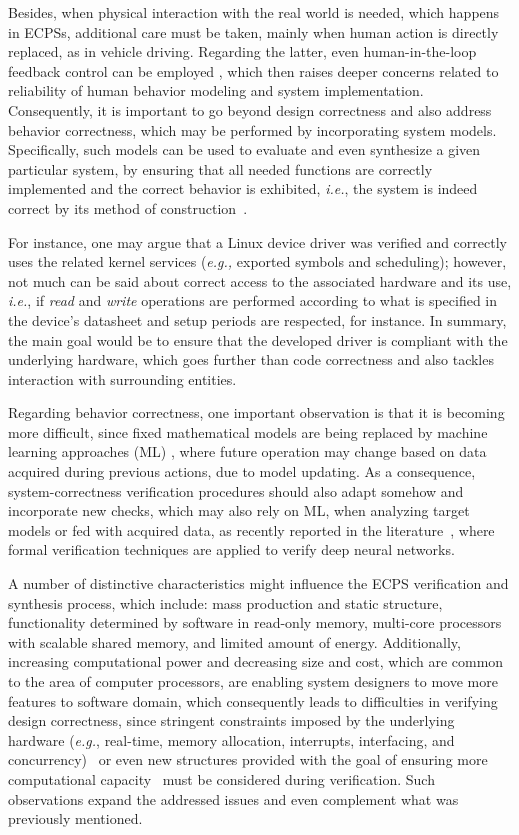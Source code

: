 \documentclass[format=acmsmall, review=false, screen=true]{acmart}
\begin{document}
Besides, when physical interaction with the real world is needed, which happens in ECPSs, additional care must be taken, mainly when human action is directly replaced, as in vehicle driving. Regarding the latter, even human-in-the-loop feedback control can be employed \cite{munir}, which then raises deeper concerns related to reliability of human behavior modeling and system implementation. Consequently, it is important to go beyond design correctness and also address behavior correctness, which may be performed by incorporating system models. Specifically, such models can be used to evaluate and even synthesize a given particular system, by ensuring that all needed functions are correctly implemented and the correct behavior is exhibited, {\it i.e.}, the system is indeed correct by its method of construction~\cite{Abate17}.

For instance, one may argue that a Linux device driver \cite{ldd} was verified and correctly uses the related kernel services ({\it e.g.,} exported symbols and scheduling); however, not much can be said about correct access to the associated hardware and its use, {\it i.e.}, if \textit{read} and \textit{write} operations are performed according to what is specified in the device's datasheet and setup periods are respected, for instance. In summary, the main goal would be to ensure that the developed driver is compliant with the underlying hardware, which goes further than code correctness and also tackles interaction with surrounding entities.

Regarding behavior correctness, one important observation is that it is becoming more difficult, since fixed mathematical models are being replaced by machine learning approaches (ML) \cite{mlembe}, where future operation may change based on data acquired during previous actions, due to model updating. As a consequence, system-correctness verification procedures should also adapt somehow and incorporate new checks, which may also rely on ML, when analyzing target models or fed with acquired data, as recently reported in the literature~\cite{DBLP:conf/cav/HuangKWW17,DBLP:conf/cav/KatzBDJK17}, where formal verification techniques are applied to verify deep neural networks.

A number of distinctive characteristics might influence the ECPS verification and synthesis process, which include: mass production and static structure, functionality determined by software in read-only memory, multi-core processors with scalable shared memory, and limited amount of energy. Additionally, increasing computational power and decreasing size and cost, which are common to the area of computer processors, are enabling system designers to move more features to software domain, which consequently leads to difficulties in verifying design correctness, since stringent constraints imposed by the underlying hardware ({\it e.g.}, real-time, memory allocation, interrupts, interfacing, and concurrency)~\cite{Kroening15} or even new structures provided with the goal of ensuring more computational capacity~\cite{cudalucas} must be considered during verification. Such observations expand the addressed issues and even complement what was previously mentioned.
\end{document}
